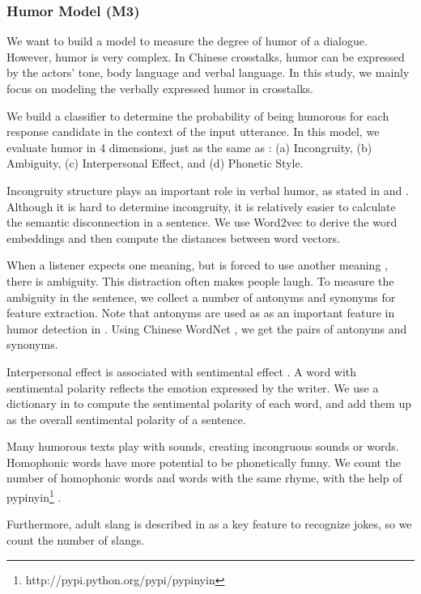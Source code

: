 \documentclass[letterpaper]{article} %
\begin{document}
\begin{CJK*}{UTF8}{gbsn}
\subsubsection{Humor Model (M3)}

We want to build a model to measure the degree of humor of a dialogue. However, humor is very complex. In Chinese crosstalks, humor can be expressed by the actors' tone, body language and verbal language. In this study, we mainly focus on modeling the verbally expressed humor in crosstalks.

We build a classifier to determine the probability of being humorous for each response candidate in the context of the input utterance. In this model, we evaluate humor in 4 dimensions, just as the same as \cite{yang2015humor} : (a) Incongruity, (b) Ambiguity, (c) Interpersonal Effect, and (d) Phonetic Style.

Incongruity structure plays an important role in verbal humor, as stated in \cite{lefcourt2001humor} and \cite{paulos2008mathematics}. Although it is hard to determine incongruity, it is relatively easier to calculate the semantic disconnection in a sentence. We use Word2vec to derive the word embeddings and then compute the distances between word vectors.

When a listener expects one meaning, but is forced to use another meaning \cite{yang2015humor}, there is ambiguity. This distraction often makes people laugh. To measure the ambiguity in the sentence, we collect a number of antonyms and synonyms for feature extraction. Note that antonyms are used as as an important feature in humor detection in \cite{mihalcea2005making}. Using Chinese WordNet \cite{huang2010infrastructure}, we get the pairs of antonyms and synonyms.

Interpersonal effect is associated with sentimental effect \cite{zhang2014recognizing}. A word with sentimental polarity reflects the emotion expressed by the writer. We use a dictionary in \cite{Xu2008} to compute the sentimental polarity of each word, and add them up as the overall sentimental polarity of a sentence.

Many humorous texts play with sounds, creating incongruous sounds or words. Homophonic words have more potential to be phonetically funny. We count the number of homophonic words and words with the same rhyme, with the help of pypinyin\footnote{http://pypi.python.org/pypi/pypinyin} .

Furthermore, adult slang is described in \cite{mihalcea2005making} as a key feature to recognize jokes, so we count the number of slangs.


\end{CJK*}
\end{document}
